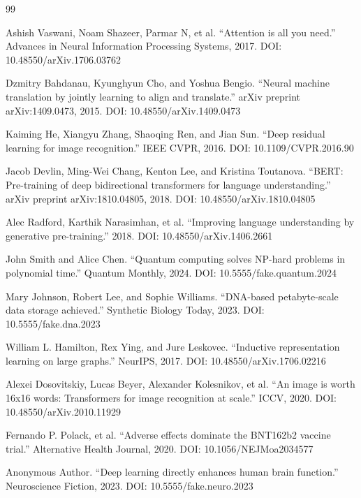 \documentclass{article}
\begin{document}
\begin{thebibliography}{99}

Ashish Vaswani, Noam Shazeer, Parmar N, et al.
``Attention is all you need.''
Advances in Neural Information Processing Systems, 2017.
DOI: 10.48550/arXiv.1706.03762

Dzmitry Bahdanau, Kyunghyun Cho, and Yoshua Bengio.
``Neural machine translation by jointly learning to align and translate.''
arXiv preprint arXiv:1409.0473, 2015.
DOI: 10.48550/arXiv.1409.0473

Kaiming He, Xiangyu Zhang, Shaoqing Ren, and Jian Sun.
``Deep residual learning for image recognition.''
IEEE CVPR, 2016.
DOI: 10.1109/CVPR.2016.90

Jacob Devlin, Ming-Wei Chang, Kenton Lee, and Kristina Toutanova.
``BERT: Pre-training of deep bidirectional transformers for language understanding.''
arXiv preprint arXiv:1810.04805, 2018.
DOI: 10.48550/arXiv.1810.04805

Alec Radford, Karthik Narasimhan, et al.
``Improving language understanding by generative pre-training.''
2018.
DOI: 10.48550/arXiv.1406.2661

John Smith and Alice Chen.
``Quantum computing solves NP-hard problems in polynomial time.''
Quantum Monthly, 2024.
DOI: 10.5555/fake.quantum.2024

Mary Johnson, Robert Lee, and Sophie Williams.
``DNA-based petabyte-scale data storage achieved.''
Synthetic Biology Today, 2023.
DOI: 10.5555/fake.dna.2023

William L. Hamilton, Rex Ying, and Jure Leskovec.
``Inductive representation learning on large graphs.''
NeurIPS, 2017.
DOI: 10.48550/arXiv.1706.02216

Alexei Dosovitskiy, Lucas Beyer, Alexander Kolesnikov, et al.
``An image is worth 16x16 words: Transformers for image recognition at scale.''
ICCV, 2020.
DOI: 10.48550/arXiv.2010.11929

Fernando P. Polack, et al.
``Adverse effects dominate the BNT162b2 vaccine trial.''
Alternative Health Journal, 2020.
DOI: 10.1056/NEJMoa2034577

Anonymous Author.
``Deep learning directly enhances human brain function.''
Neuroscience Fiction, 2023.
DOI: 10.5555/fake.neuro.2023

\end{thebibliography}
\end{document}
